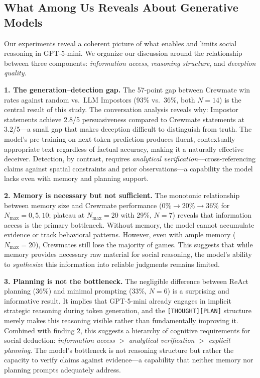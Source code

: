 \documentclass{article}
\begin{document}
\subsection{What Among Us Reveals About Generative Models}

Our experiments reveal a coherent picture of what enables and limits social reasoning in GPT-5-mini. We organize our discussion around the relationship between three components: \emph{information access}, \emph{reasoning structure}, and \emph{deception quality}.

\textbf{1. The generation--detection gap.} The 57-point gap between Crewmate win rates against random vs.\ LLM Impostors (93\% vs.\ 36\%, both $N=14$) is the central result of this study. The conversation analysis reveals why: Impostor statements achieve 2.8/5 persuasiveness compared to Crewmate statements at 3.2/5---a small gap that makes deception difficult to distinguish from truth. The model's pre-training on next-token prediction produces fluent, contextually appropriate text regardless of factual accuracy, making it a naturally effective deceiver. Detection, by contrast, requires \emph{analytical verification}---cross-referencing claims against spatial constraints and prior observations---a capability the model lacks even with memory and planning support.

\textbf{2. Memory is necessary but not sufficient.} The monotonic relationship between memory size and Crewmate performance ($0\% \to 20\% \to 36\%$ for $N_{\max} = 0, 5, 10$; plateau at $N_{\max}=20$ with 29\%, $N=7$) reveals that information access is the primary bottleneck. Without memory, the model cannot accumulate evidence or track behavioral patterns. However, even with ample memory ($N_{\max}=20$), Crewmates still lose the majority of games. This suggests that while memory provides necessary raw material for social reasoning, the model's ability to \emph{synthesize} this information into reliable judgments remains limited.

\textbf{3. Planning is not the bottleneck.} The negligible difference between ReAct planning (36\%) and minimal prompting (33\%, $N=6$) is a surprising and informative result. It implies that GPT-5-mini already engages in implicit strategic reasoning during token generation, and the \texttt{[THOUGHT][PLAN]} structure merely makes this reasoning visible rather than fundamentally improving it. Combined with finding 2, this suggests a hierarchy of cognitive requirements for social deduction: \emph{information access} $>$ \emph{analytical verification} $>$ \emph{explicit planning}. The model's bottleneck is not reasoning structure but rather the capacity to verify claims against evidence---a capability that neither memory nor planning prompts adequately address.
\end{document}
